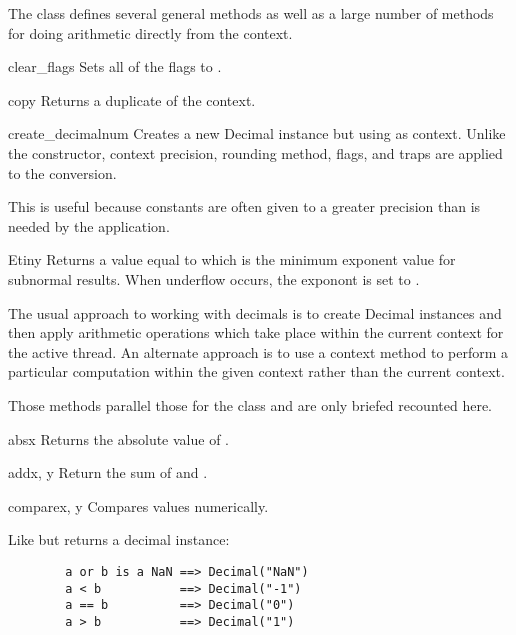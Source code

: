 The  class defines several general methods as well as a
large number of methods for doing arithmetic directly from the context.

\begin{methoddesc}{clear_flags}{}
  Sets all of the flags to .
\end{methoddesc}  

\begin{methoddesc}{copy}{}
  Returns a duplicate of the context.
\end{methoddesc}  

\begin{methoddesc}{create_decimal}{num}
  Creates a new Decimal instance but using  as context.
  Unlike the  constructor, context precision,
  rounding method, flags, and traps are applied to the conversion.

  This is useful because constants are often given to a greater
  precision than is needed by the application.
\end{methoddesc} 

\begin{methoddesc}{Etiny}{}
  Returns a value equal to  which is the minimum
  exponent value for subnormal results.  When underflow occurs, the
  exponont is set to .
\end{methoddesc} 

The usual approach to working with decimals is to create Decimal
instances and then apply arithmetic operations which take place
within the current context for the active thread.  An alternate
approach is to use a context method to perform a particular
computation within the given context rather than the current context.

Those methods parallel those for the  class and are
only briefed recounted here.


\begin{methoddesc}{abs}{x}
  Returns the absolute value of .
\end{methoddesc}

\begin{methoddesc}{add}{x, y}
  Return the sum of  and .
\end{methoddesc}
   
\begin{methoddesc}{compare}{x, y}
  Compares values numerically.
  
  Like  but returns a decimal instance:
  \begin{verbatim}
        a or b is a NaN ==> Decimal("NaN")
        a < b           ==> Decimal("-1")
        a == b          ==> Decimal("0")
        a > b           ==> Decimal("1")
  \end{verbatim}                                          
\end{methoddesc}

